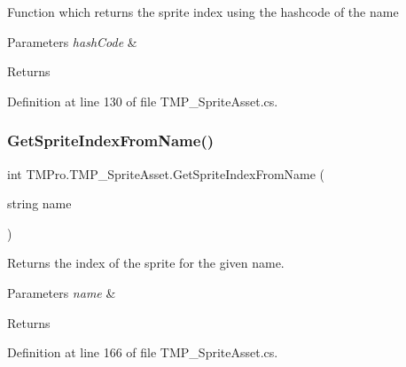 Function which returns the sprite index using the hashcode of the name 


\begin{DoxyParams}{Parameters}
{\em hash\+Code} & \\
\hline
\end{DoxyParams}
\begin{DoxyReturn}{Returns}

\end{DoxyReturn}


Definition at line 130 of file T\+M\+P\+\_\+\+Sprite\+Asset.\+cs.

\mbox{\label{class_t_m_pro_1_1_t_m_p___sprite_asset_afa0139e3dcab964f9cfcf1fc634caad2}} 
\subsubsection{\texorpdfstring{GetSpriteIndexFromName()}{GetSpriteIndexFromName()}}
{\footnotesize\ttfamily int T\+M\+Pro.\+T\+M\+P\+\_\+\+Sprite\+Asset.\+Get\+Sprite\+Index\+From\+Name (\begin{DoxyParamCaption}\item[{string}]{name }\end{DoxyParamCaption})}



Returns the index of the sprite for the given name. 


\begin{DoxyParams}{Parameters}
{\em name} & \\
\hline
\end{DoxyParams}
\begin{DoxyReturn}{Returns}

\end{DoxyReturn}


Definition at line 166 of file T\+M\+P\+\_\+\+Sprite\+Asset.\+cs.

\mbox{\label{class_t_m_pro_1_1_t_m_p___sprite_asset_ae038e36239dc860b452fca1abd8284ef}} 
